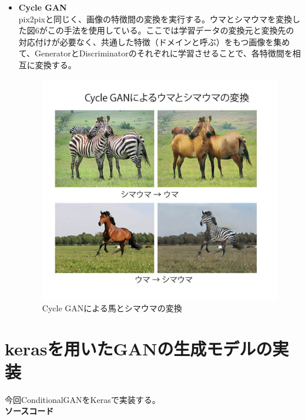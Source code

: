 \documentclass{jarticle}
\begin{document}
\begin{itemize}
\item \textbf{Cycle GAN}\\
pix2pixと同じく、画像の特徴間の変換を実行する。ウマとシマウマを変換した図6がこの手法を使用している。ここでは学習データの変換元と変換先の対応付けが必要なく、共通した特徴（ドメインと呼ぶ）をもつ画像を集めて、GeneratorとDiscriminatorのそれぞれに学習させることで、各特徴間を相互に変換する。
\begin{figure}[h]
\centering
\includegraphics[width=12cm]{pic7.jpg}
\caption{Cycle GANによる馬とシマウマの変換}
\label{GAN6}
\end{figure}

\end{itemize}

\section{kerasを用いたGANの生成モデルの実装}
今回ConditionalGANをKerasで実装する。\\
\textbf{ソースコード}

\end{document}
